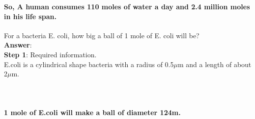 \documentclass[11pt]{exam}
\begin{document}
\begin{questions}
\textbf{So, A human consumes 110 moles of water a day and 2.4 million moles in his life span.}                \\ \\


\question
\label{Q12:E.coli}
For a bacteria E. coli, how big a ball of 1 mole of E. coli will be? \\
\textbf{Answer}:\\
\textbf{Step 1}: Required information. \\
                E.coli is a cylindrical shape bacteria with a radius of 0.5$\mu$m and a length of about 2$\mu$m. \\ \\
 \\ \\
                 \textbf{1 mole of E.coli will make a ball of diameter 124m.}\\ \\ \\ \\ \\ \\ \\ \\ \\


\end{questions}
\end{document}
